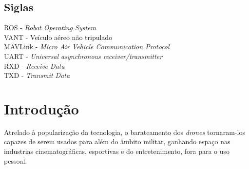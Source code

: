 \documentclass[12pt,a4paper,oneside]{book}
\begin{document}
%
\listoffigures
%
%
\thispagestyle{myheadings}
%


%
\listoftables
%
%
\thispagestyle{myheadings}
%


%
\tableofcontents
%
\thispagestyle{myheadings}

\clearpage



%



\section{Siglas}
ROS - \textit{Robot Operating System} \\
VANT - Veículo aéreo não tripulado \\
MAVLink - \textit{Micro Air Vehicle Communication Protocol} \\
UART - \textit{Universal asynchronous receiver/transmitter} \\
RXD - \textit{Receive Data}\\
TXD - \textit{Transmit Data}\\

\chapter{Introdução}
%
\thispagestyle{empty} 
%
%
Atrelado à popularização da tecnologia, o barateamento dos \textit{drones} tornaram-los capazes de serem usados para além do âmbito militar, ganhando espaço nas industrias cinematográficas, esportivas e do entretenimento, fora para o uso pessoal.\\
\end{document}
